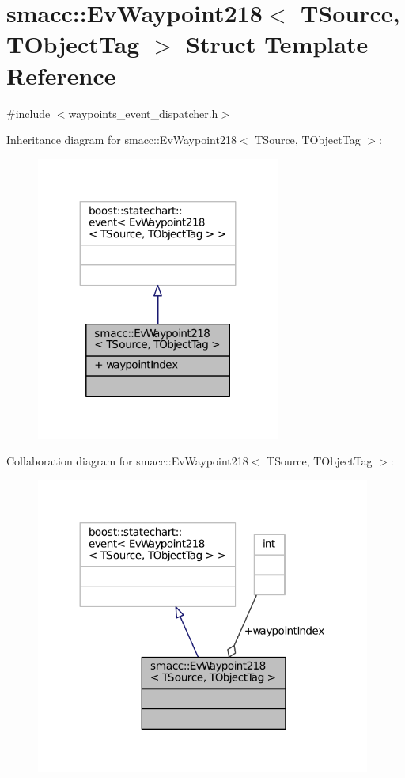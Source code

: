 \hypertarget{structsmacc_1_1EvWaypoint218}{}\section{smacc\+:\+:Ev\+Waypoint218$<$ T\+Source, T\+Object\+Tag $>$ Struct Template Reference}
\label{structsmacc_1_1EvWaypoint218}


{\ttfamily \#include $<$waypoints\+\_\+event\+\_\+dispatcher.\+h$>$}



Inheritance diagram for smacc\+:\+:Ev\+Waypoint218$<$ T\+Source, T\+Object\+Tag $>$\+:
\nopagebreak
\begin{figure}[H]
\begin{center}
\leavevmode
\includegraphics[width=227pt]{structsmacc_1_1EvWaypoint218__inherit__graph}
\end{center}
\end{figure}


Collaboration diagram for smacc\+:\+:Ev\+Waypoint218$<$ T\+Source, T\+Object\+Tag $>$\+:
\nopagebreak
\begin{figure}[H]
\begin{center}
\leavevmode
\includegraphics[width=312pt]{structsmacc_1_1EvWaypoint218__coll__graph}
\end{center}
\end{figure}
